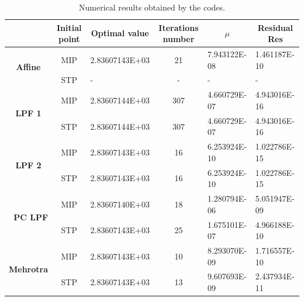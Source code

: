 \documentclass[a4paper,10 pt,titlepage,twoside]{book}
\theoremstyle{plain}
\theoremstyle{definition}
\theoremstyle{remark}
\begin{document}
\begin{table}[]\caption{\label{table:ONB}Numerical results obtained by the codes.}
	\begin{tabular}{cclcll}
		\hline		\textbf{} & \textbf{Initial point} & \multicolumn{1}{c}{\textbf{Optimal value}} & \textbf{Iterations number} & \multicolumn{1}{c}{\textbf{$\mu$}} & \multicolumn{1}{c}{\textbf{Residual} Res} \\ \hline
		\multicolumn{1}{c|}{\multirow{2}{*}{\textbf{Affine}}} & MIP & 2.83607143E+03 & 21 & 7.943122E-08 & 1.461187E-10 \\
		\multicolumn{1}{c|}{} & STP & - & - & - & - \\ \hline
		\multicolumn{1}{c|}{\multirow{2}{*}{\textbf{LPF 1}}} & MIP & 2.83607144E+03 & 307 & 4.660729E-07 & 4.943016E-16 \\
		\multicolumn{1}{c|}{} & STP & 2.83607144E+03 & 307 & 4.660729E-07 & 4.943016E-16 \\ \hline
		\multicolumn{1}{c|}{\multirow{2}{*}{\textbf{LPF 2}}} & MIP & 2.83607143E+03 & 16 & 6.253924E-10 & 1.022786E-15 \\
		\multicolumn{1}{c|}{} & STP & 2.83607143E+03 & 16 & 6.253924E-10 & 1.022786E-15 \\ \hline
		\multicolumn{1}{r|}{\multirow{2}{*}{\textbf{PC LPF}}} & MIP & 2.83607140E+03 & 18 & 1.280794E-06 & 5.051947E-09 \\
		\multicolumn{1}{r|}{} & STP & 2.83607143E+03 & 25 & 1.675101E-07 & 4.966188E-10 \\ \hline
		\multicolumn{1}{c|}{\multirow{2}{*}{\textbf{Mehrotra}}} & MIP & 2.83607143E+03 & 10 & 8.293070E-09 & 1.716557E-10 \\
		\multicolumn{1}{c|}{} & STP & 2.83607143E+03  & 13 & 9.607693E-09 & 2.437934E-11 \\ \hline
	\end{tabular}
\end{table}
\end{document}
